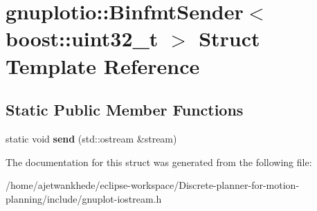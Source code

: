 \hypertarget{structgnuplotio_1_1BinfmtSender_3_01boost_1_1uint32__t_01_4}{}\section{gnuplotio\+:\+:Binfmt\+Sender$<$ boost\+:\+:uint32\+\_\+t $>$ Struct Template Reference}
\label{structgnuplotio_1_1BinfmtSender_3_01boost_1_1uint32__t_01_4}
\subsection*{Static Public Member Functions}
\begin{DoxyCompactItemize}
\item 
\mbox{\label{structgnuplotio_1_1BinfmtSender_3_01boost_1_1uint32__t_01_4_a134bce57dc5bb3e06c1b369a9826403b}} 
static void {\bfseries send} (std\+::ostream \&stream)
\end{DoxyCompactItemize}


The documentation for this struct was generated from the following file\+:\begin{DoxyCompactItemize}
\item 
/home/ajetwankhede/eclipse-\/workspace/\+Discrete-\/planner-\/for-\/motion-\/planning/include/gnuplot-\/iostream.\+h\end{DoxyCompactItemize}
